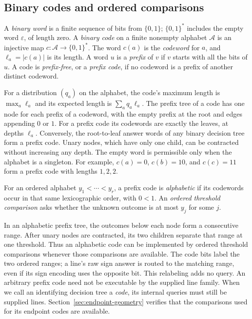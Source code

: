 

\subsection{Binary codes and ordered comparisons}

\begin{definition}\label{def:binary-code}
A \emph{binary word} is a finite sequence of bits from $\{0,1\}$;
$\{0,1\}^*$ includes the empty word $\varepsilon$, of length zero.
A \emph{binary code} on a finite nonempty alphabet $\mathcal A$ is
an injective map $c:\mathcal A\to\{0,1\}^*$. The word $c(a)$ is
the \emph{codeword} for $a$, and $\ell_a=|c(a)|$ is its length.
A word $u$ is a \emph{prefix} of $v$ if $v$ starts with all the
bits of $u$. A code is \emph{prefix-free}, or a \emph{prefix code},
if no codeword is a prefix of another distinct codeword.
\end{definition}

For a distribution $(q_a)$ on the alphabet, the code's maximum
length is $\max_a\ell_a$ and its expected length is
$\sum_a q_a\ell_a$.
The prefix tree of a code has one node for each prefix of a
codeword, with the empty prefix at the root and edges appending
$0$ or $1$. For a prefix code its codewords are exactly the leaves,
at depths $\ell_a$. Conversely, the root-to-leaf answer words of
any binary decision tree form a prefix code. Unary nodes, which
have only one child, can be contracted without increasing any depth.
The empty word is permissible only when the alphabet is a singleton.
For example, $c(a)=0$, $c(b)=10$, and $c(c)=11$ form a prefix code
with lengths $1,2,2$.

\begin{definition}\label{def:alphabetic-code}
For an ordered alphabet $y_1<\cdots<y_r$, a prefix code is
\emph{alphabetic} if its codewords occur in that same lexicographic
order, with $0<1$. An \emph{ordered threshold comparison} asks
whether the unknown outcome is at most $y_j$ for some $j$.
\end{definition}

In an alphabetic prefix tree, the outcomes below each node form
a consecutive range. After unary nodes are contracted, its two
children separate that range at one threshold. Thus an alphabetic
code can be implemented by ordered threshold comparisons whenever
those comparisons are available. The code bits label the two
ordered ranges; a line's raw sign answer is routed to the matching
range, even if its sign encoding uses the opposite bit. This
relabeling adds no query. An arbitrary prefix code need
not be executable by the supplied line family. When we call an
identifying decision tree a \emph{code}, its internal queries must
still be supplied lines. Section~\ref{sec:endpoint-geometry} verifies
that the comparisons used for its endpoint codes are available.

